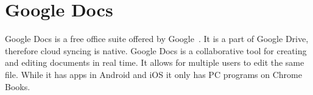 \section{Google Docs}

Google Docs is a free office suite offered by 
Google~\cite{www-hid-sp18-601-gdoc-about}. It is a part of Google 
Drive, therefore cloud syncing is native. Google Docs is a collaborative tool
for creating and editing documents in real time. It allows for multiple users
to edit the same file. While it has apps in Android and iOS it only has PC
programs on Chrome Books.